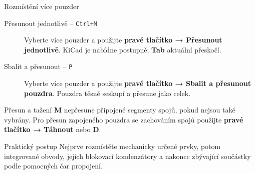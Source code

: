 \documentclass{beamer}
\begin{document}
\begin{frame}{Rozmístění více pouzder}
	\small
	\begin{description}
		\item[Přesunout jednotlivě -- \texttt{Ctrl+M}] Vyberte více pouzder a použijte \textbf{pravé tlačítko → Přesunout jednotlivě}. KiCad je nabídne postupně; \textbf{Tab} aktuální přeskočí.
		\item[Sbalit a přesunout -- \texttt{P}] Vyberte více pouzder a použijte \textbf{pravé tlačítko → Sbalit a přesunout pouzdra}. Pouzdra těsně seskupí a přesune jako celek.
	\end{description}
	\begin{block}{Přesun a tažení}
	\textbf{M} nepřesune připojené segmenty spojů, pokud nejsou také vybrány. Pro přesun zapojeného pouzdra se zachováním spojů použijte \textbf{pravé tlačítko → Táhnout} nebo \textbf{D}.
	\end{block}
	\begin{block}{Praktický postup}
	Nejprve rozmístěte mechanicky určené prvky, potom integrované obvody, jejich blokovací kondenzátory a nakonec zbývající součástky podle pomocných čar propojení.
	\end{block}
\end{frame}
\end{document}
